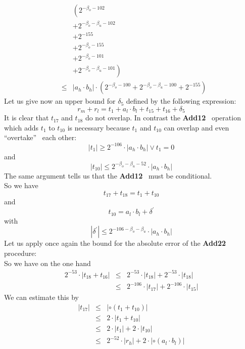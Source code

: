 \documentclass[a4paper,10pt,twoside]{article}
\newenvironment{proof}[1][Proof]{\begin{trivlist}
\item[\hskip \labelsep {\bfseries #1}]}{\end{trivlist}}
\newcommand{\hi}{\ensuremath{\mathit{h}}}
\newcommand{\mi}{\ensuremath{\mathit{m}}}
\newcommand{\lo}{\ensuremath{\mathit{l}}}
\newcommand{\ouvguill}{``}
\newcommand{\fermguill}{''}
\newcommand{\Add}{{\bf Add12}}
\newcommand{\AddDD}{{\bf Add22}}
\begin{document}
\begin{proof}
\begin{eqnarray*}
& & \left( 2^{-\beta_o-102} \right. \\
& & + 2^{-\beta_o-\beta_u-102} \\
& & + 2^{-155} \\
& & + 2^{-\beta_o-155} \\
& & + 2^{-\beta_o-101} \\
& & \left. + 2^{-\beta_o-\beta_u-101} \right) \\
& \leq & \left \vert a_\hi \cdot b_\hi \right \vert \cdot \left( 2^{-\beta_o-100} + 2^{-\beta_o-\beta_u-100} + 2^{-155} \right)
\end{eqnarray*}
Let us give now an upper bound for $\delta_5$ defined by the following expression:
$$r_\mi + r_\lo = t_1 + a_\lo \cdot b_\lo + t_{15} + t_{16} + \delta_5$$
It is clear that $t_{17}$ and $t_{18}$ do not overlap. In contrast the \Add~ operation which adds $t_1$ to $t_{10}$ is 
necessary because $t_1$ and $t_{10}$ can overlap and even \ouvguill overtake\fermguill~ each other: 
$$\left \vert t_1 \right \vert \geq 2^{-106} \cdot \left \vert a_\hi \cdot b_\hi \right \vert \lor t_1 = 0$$
and
$$\left \vert t_{10} \right \vert \leq 2^{-\beta_o-\beta_u-52} \cdot \left \vert a_\hi \cdot b_\hi \right \vert$$
The same argument tells us that the \Add~ must be conditional. \\
So we have
$$t_{17} + t_{18} = t_1 + t_{10}$$
and
$$t_{10} = a_\lo \cdot b_\lo + \delta^\prime$$
with
$$\left \vert \delta^\prime \right \vert \leq 2^{-106-\beta_o-\beta_u} \cdot \left \vert a_\hi \cdot b_\hi \right \vert$$
Let us apply once again the bound for the absolute error of the \AddDD~ procedure:\\
So we have on the one hand
\begin{eqnarray*}
2^{-53} \cdot \left \vert t_{18} + t_{16} \right \vert & \leq & 
2^{-53} \cdot \left \vert t_{18} \right \vert + 2^{-53} \cdot \left \vert t_{18} \right \vert \\
& \leq & 2^{-106} \cdot \left \vert t_{17} \right \vert + 2^{-106} \cdot \left \vert t_{15} \right \vert
\end{eqnarray*}
We can estimate this by
\begin{eqnarray*}
\left \vert t_{17} \right \vert & \leq & \left \vert \circ \left( t_1 + t_{10} \right) \right \vert \\
& \leq & 2 \cdot \left \vert t_1 + t_{10} \right \vert \\
& \leq & 2 \cdot \left \vert t_1 \right \vert + 2 \cdot \left \vert t_{10} \right \vert \\
& \leq & 2^{-52} \cdot \left \vert r_\hi \right \vert + 2 \cdot \left \vert \circ \left( a_\lo \cdot b_\lo \right) \right \vert \\

\end{eqnarray*}
\end{proof}
\end{document}
